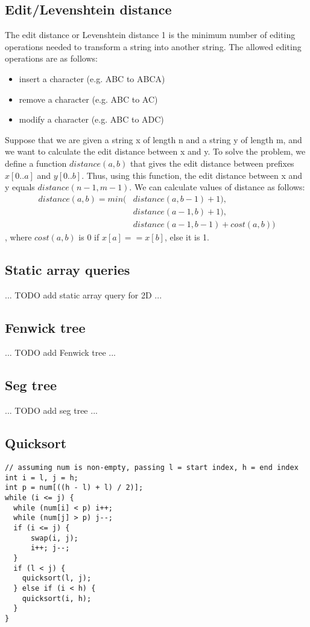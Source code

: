 \documentclass[a4paper]{article}
\begin{document}
\subsection{Edit/Levenshtein distance}
The edit distance or Levenshtein distance 1 is the minimum number of editing operations needed to transform a string into another string. The allowed editing operations are as follows:
\begin{itemize}
  \item insert a character (e.g. ABC to ABCA)
  \item remove a character (e.g. ABC to AC)
  \item modify a character (e.g. ABC to ADC)
\end{itemize}
Suppose that we are given a string x of length n and a string y of length m, and we want to calculate the edit distance between x and y. To solve the problem, we define a function $distance(a, b)$ that gives the edit distance between prefixes
$x[0..a]$ and $y[0..b]$. Thus, using this function, the edit distance between x and y equals $distance(n - 1, m - 1)$.
We can calculate values of distance as follows:
\begin{align}
  distance(a, b) = min(&distance(a, b - 1) + 1), \\
                       &distance(a - 1, b) + 1), \\
                       &distance(a - 1, b - 1) + cost(a, b))
\end{align}
, where $cost(a, b)$ is 0 if $x[a] == x[b]$, else it is 1.


\subsection{Static array queries}
... TODO add static array query for 2D ...


\subsection{Fenwick tree}
... TODO add Fenwick tree ...


\subsection{Seg tree}
... TODO add seg tree ...


\subsection{Quicksort}
\begin{lstlisting}
// assuming num is non-empty, passing l = start index, h = end index
int i = l, j = h;
int p = num[((h - l) + l) / 2)];
while (i <= j) {
  while (num[i] < p) i++;
  while (num[j] > p) j--;
  if (i <= j) {
      swap(i, j);
      i++; j--;
  }
  if (l < j) {
    quicksort(l, j);
  } else if (i < h) {
    quicksort(i, h);
  }
}
\end{lstlisting}
\end{document}
